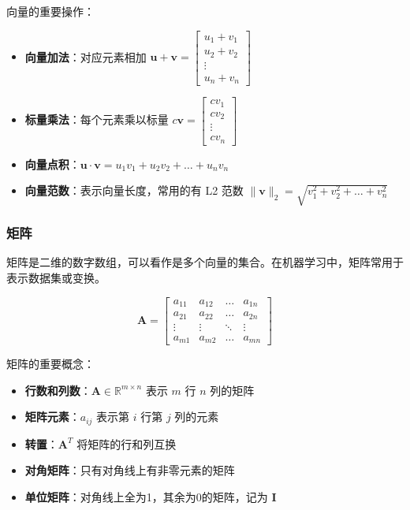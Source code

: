 \documentclass[12pt,UTF8]{ctexbook}
\begin{document}
向量的重要操作：
\begin{itemize}[leftmargin=2cm]
    \item \textbf{向量加法}：对应元素相加 $\mathbf{u} + \mathbf{v} = \begin{bmatrix} u_1+v_1 \\ u_2+v_2 \\ \vdots \\ u_n+v_n \end{bmatrix}$
    \item \textbf{标量乘法}：每个元素乘以标量 $c\mathbf{v} = \begin{bmatrix} cv_1 \\ cv_2 \\ \vdots \\ cv_n \end{bmatrix}$
    \item \textbf{向量点积}：$\mathbf{u} \cdot \mathbf{v} = u_1v_1 + u_2v_2 + \dots + u_nv_n$
    \item \textbf{向量范数}：表示向量长度，常用的有 L2 范数 $\|\mathbf{v}\|_2 = \sqrt{v_1^2 + v_2^2 + \dots + v_n^2}$
\end{itemize}

\subsubsection{矩阵}

矩阵是二维的数字数组，可以看作是多个向量的集合。在机器学习中，矩阵常用于表示数据集或变换。

$$\mathbf{A} = \begin{bmatrix}
a_{11} & a_{12} & \dots & a_{1n} \\
a_{21} & a_{22} & \dots & a_{2n} \\
\vdots & \vdots & \ddots & \vdots \\
a_{m1} & a_{m2} & \dots & a_{mn}
\end{bmatrix}$$

矩阵的重要概念：
\begin{itemize}[leftmargin=2cm]
    \item \textbf{行数和列数}：$\mathbf{A} \in \mathbb{R}^{m \times n}$ 表示 $m$ 行 $n$ 列的矩阵
    \item \textbf{矩阵元素}：$a_{ij}$ 表示第 $i$ 行第 $j$ 列的元素
    \item \textbf{转置}：$\mathbf{A}^T$ 将矩阵的行和列互换
    \item \textbf{对角矩阵}：只有对角线上有非零元素的矩阵
    \item \textbf{单位矩阵}：对角线上全为1，其余为0的矩阵，记为 $\mathbf{I}$
\end{itemize}
\end{document}
